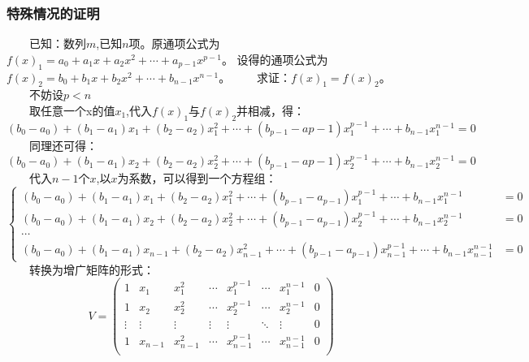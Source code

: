 \documentclass[12pt]{article}
\begin{document}
        \subsubsection{特殊情况的证明}
          　　已知：数列$m$,已知$n$项。原通项公式为$f(x)_{1}=a_{0}+a_{1}x+a_{2}x^{2}+\cdots{}+a_{p-1}x^{p-1}$。
          设得的通项公式为$f(x)_{2}=b_{0}+b_{1}x+b_{2}x^{2}+\cdots{}+b_{n-1}x^{n-1}$。
          　　求证：$f(x)_{1}=f(x)_{2}$。\\
          　　不妨设$p<n$\\
          　　取任意一个x的值$x_{1}$,代入$f(x)_{1}$与$f(x)_{2}$并相减，得：
          \begin{equation}
            (b_{0}-a_{0})+(b_{1}-a_{1})x_{1}+(b_{2}-a_{2})x_{1}^{2}+\cdots+(b_{p-1}-a{p-1})x_{1}^{p-1}+\cdots+b_{n-1}x_{1}^{n-1}=0
          \end{equation}
          　　同理还可得：
          \begin{equation}
            (b_{0}-a_{0})+(b_{1}-a_{1})x_{2}+(b_{2}-a_{2})x_{2}^{2}+\cdots+(b_{p-1}-a{p-1})x_{2}^{p-1}+\cdots+b_{n-1}x_{2}^{n-1}=0
          \end{equation}
          　　代入$n-1$个$x$,以$x$为系数，可以得到一个方程组：
          \begin{equation}
            \left\{
              \begin{aligned}
                (b_{0}-a_{0})+(b_{1}-a_{1})x_{1}+(b_{2}-a_{2})x_{1}^{2}+\cdots+(b_{p-1}-a_{p-1})x_{1}^{p-1}+\cdots+b_{n-1}x_{1}^{n-1}&=0\\
                (b_{0}-a_{0})+(b_{1}-a_{1})x_{2}+(b_{2}-a_{2})x_{2}^{2}+\cdots+(b_{p-1}-a_{p-1})x_{2}^{p-1}+\cdots+b_{n-1}x_{2}^{n-1}&=0\\
                \cdots\\
                (b_{0}-a_{0})+(b_{1}-a_{1})x_{n-1}+(b_{2}-a_{2})x_{n-1}^{2}+\cdots+(b_{p-1}-a_{p-1})x_{n-1}^{p-1}+\cdots+b_{n-1}x_{n-1}^{n-1}&=0
              \end{aligned}
            \right.
          \end{equation}
          　　转换为增广矩阵的形式：
          \begin{equation}
            V=\left (
              \begin{array}{ccccccc|c}
                1 & x_{1} & x_{1}^{2} & \cdots & x_{1}^{p-1} & \cdots & x_{1}^{n-1} & 0 \\
                1 & x_{2} & x_{2}^{2} & \cdots & x_{2}^{p-1} & \cdots & x_{2}^{n-1} & 0 \\
                \vdots & \vdots & \vdots & \vdots & \vdots & \ddots & \vdots & 0 \\
                1 & x_{n-1} & x_{n-1}^{2}  & \cdots & x_{n-1}^{p-1}  & \cdots & x_{n-1}^{n-1} & 0\\
              \end{array}
            \right)
          \end{equation}
\end{document}
